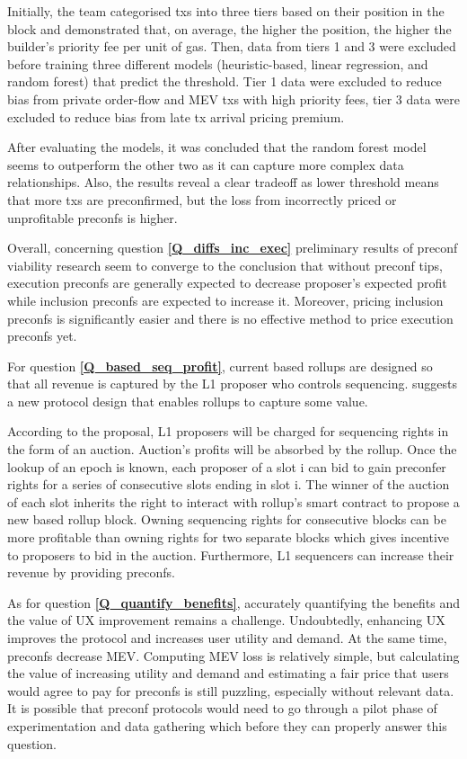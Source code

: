 \documentclass[a4paper]{article}
\theoremstyle{boldstyle}
\begin{document}
    Initially, the team categorised txs into three tiers based on their position in the block and demonstrated that, on average, the higher the position, the higher the builder's priority fee per unit of gas. Then, data from tiers 1 and 3 were excluded before training three different models (heuristic-based, linear regression, and random forest) that predict the threshold. Tier 1 data were excluded to reduce bias from private order-flow and MEV txs with high priority fees, tier 3 data were excluded to reduce bias from late tx arrival pricing premium.

    After evaluating the models, it was concluded that the random forest model seems to outperform the other two as it can capture more complex data relationships. Also, the results reveal a clear tradeoff as lower threshold means that more txs are preconfirmed, but the loss from incorrectly priced or unprofitable preconfs is higher.

    Overall, concerning question \textbf{\ref{Q_diffs_inc_exec}} preliminary results of preconf viability research seem to converge to the conclusion that without preconf tips, execution preconfs are generally expected to decrease proposer's expected profit while inclusion preconfs are expected to increase it. Moreover, pricing inclusion preconfs is significantly easier and there is no effective method to price execution preconfs yet.

    For question \textbf{\ref{Q_based_seq_profit}}, current based rollups are designed so that all revenue is captured by the L1 proposer who controls sequencing. \cite{W:Value-CapturingBasedRollupswithBasedPreconfirmations} suggests a new protocol design that enables rollups to capture some value.

    According to the proposal, L1 proposers will be charged for sequencing rights in the form of an auction. Auction's profits will be absorbed by the rollup. Once the lookup of an epoch is known, each proposer of a slot i can bid to gain preconfer rights for a series of consecutive slots ending in slot i. The winner of the auction of each slot inherits the right to interact with rollup's smart contract to propose a new based rollup block. Owning sequencing rights for consecutive blocks can be more profitable than owning rights for two separate blocks which gives incentive to proposers to bid in the auction. Furthermore, L1 sequencers can increase their revenue by providing preconfs.

    As for question \textbf{\ref{Q_quantify_benefits}}, accurately quantifying the benefits and the value of UX improvement remains a challenge. Undoubtedly, enhancing UX improves the protocol and increases user utility and demand. At the same time, preconfs decrease MEV. Computing MEV loss is relatively simple, but calculating the value of increasing utility and demand and estimating a fair price that users would agree to pay for preconfs is still puzzling, especially without relevant data. It is possible that preconf protocols would need to go through a pilot phase of experimentation and data gathering which before they can properly answer this question.
\end{document}
